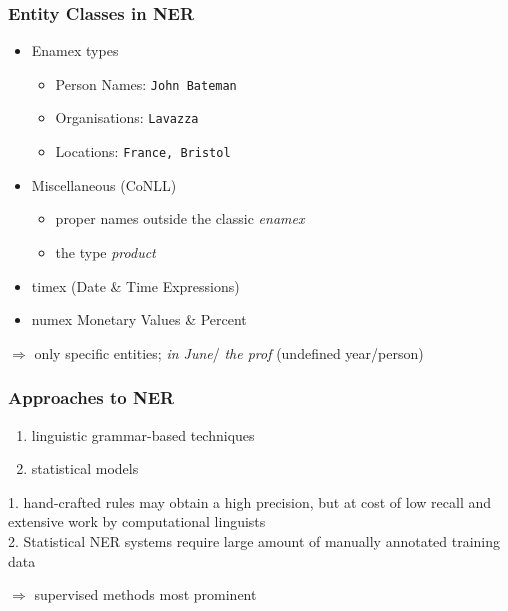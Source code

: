 \documentclass[10pt]{beamer}
\begin{document}
\begin{frame}
\frametitle{Entity Classes in NER}

\begin{itemize}
 \item Enamex types
\begin{itemize}
 \item Person Names: \texttt{John Bateman}
 \item Organisations: \texttt{Lavazza}
 \item Locations: \texttt{France, Bristol}
\end{itemize}

 \item Miscellaneous (CoNLL)
 \begin{itemize}
  \item  proper names outside the classic \emph{enamex}
  \item the type \emph{product}
 \end{itemize}

 \item timex (Date \& Time Expressions)
 
\item numex Monetary Values \& Percent
\end{itemize}	

$\Rightarrow$ only specific entities; \emph{in June}/ \emph{the prof} (undefined year/person) %
 \end{frame}

 


\begin{frame}
\frametitle{Approaches to NER}

\begin{enumerate}
 \item linguistic grammar-based techniques
 \item statistical models
\end{enumerate}

1. hand-crafted rules may obtain a high precision, but at cost of low recall
and extensive work by computational linguists\\

2. Statistical NER systems require large amount of manually annotated training data

$\Rightarrow$ supervised methods most prominent


\end{frame}
\end{document}

